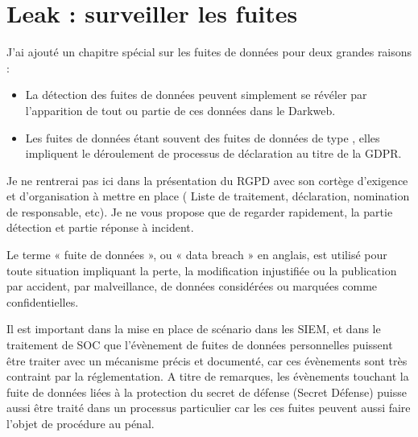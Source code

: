 

\section{Leak  : surveiller les fuites}

J'ai ajouté un chapitre spécial sur les fuites de données pour deux grandes raisons :

\begin{itemize}
  \item La détection des fuites de données peuvent simplement se révéler par l'apparition de tout ou partie de ces données dans le Darkweb. 
  \item Les fuites de données étant souvent des fuites de données de type , elles impliquent le déroulement de processus de déclaration au titre de la GDPR.
\end{itemize}


Je ne rentrerai pas ici dans la présentation du RGPD avec son cortège d'exigence et d'organisation à mettre en place (
Liste de traitement, déclaration, nomination de responsable, etc).
Je ne vous propose que de regarder rapidement, la partie détection et partie réponse à incident.

Le terme « fuite de données », ou « data breach » en anglais, est utilisé pour toute situation impliquant la perte, la modification injustifiée ou la publication par accident, par malveillance, de données considérées ou marquées comme confidentielles. 

Il est important dans la mise en place de scénario dans les SIEM, et dans le traitement de SOC que l'évènement de fuites de données personnelles puissent être traiter avec un mécanisme précis et documenté, car ces évènements sont très contraint par la réglementation.
A titre de remarques, les évènements touchant la fuite de données liées à la protection du secret de défense (Secret Défense) puisse aussi être traité dans un processus particulier car les ces fuites peuvent aussi faire l'objet de procédure au pénal.


